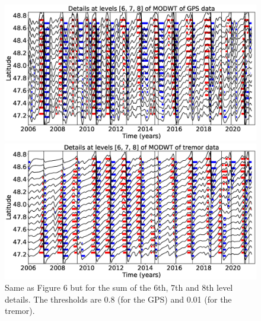 \documentclass{article}
\begin{document}
\begin{figure}
\noindent\includegraphics[width=\textwidth, trim={0cm 0cm 0cm 0cm},clip]{figures/GPS_longer_detail_6-7-8.eps}

\noindent\includegraphics[width=\textwidth, trim={0cm 0cm 0cm 0cm},clip]{figures/tremor_longer_detail_6-7-8.eps}
\caption{Same as Figure 6 but for the sum of the 6th, 7th and 8th level details. The thresholds are 0.8 (for the GPS) and 0.01 (for the tremor).}
\label{pngfiguresample}
\end{figure}
\end{document}

